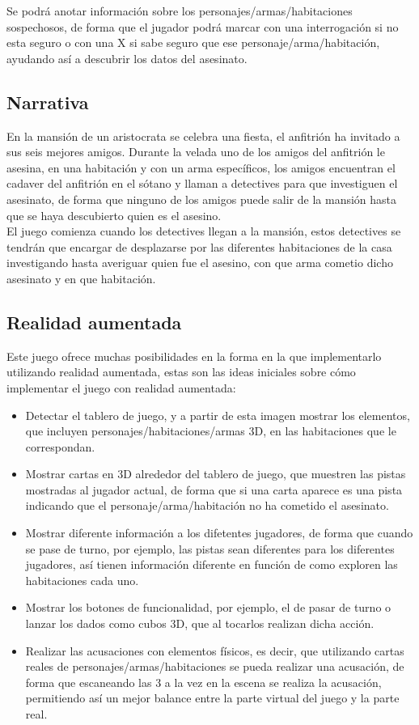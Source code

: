 Se podrá anotar información sobre los personajes/armas/habitaciones sospechosos, de forma que el jugador podrá marcar con una interrogación si no esta seguro o con una X si sabe seguro que ese personaje/arma/habitación, ayudando así a descubrir los datos del asesinato.

\subsection{Narrativa}
En la mansión de un aristocrata se celebra una fiesta, el anfitrión ha invitado a sus seis mejores amigos. Durante la velada uno de los amigos del anfitrión le asesina, en una habitación y con un arma específicos, los amigos encuentran el cadaver del anfitrión en el sótano y llaman a detectives para que investiguen el asesinato, de forma que ninguno de los amigos puede salir de la mansión hasta que se haya descubierto quien es el asesino.\\

El juego comienza cuando los detectives llegan a la mansión, estos detectives se tendrán que encargar de desplazarse por las diferentes habitaciones de la casa investigando hasta averiguar quien fue el asesino, con que arma cometio dicho asesinato y en que habitación.

\subsection{Realidad aumentada}
Este juego ofrece muchas posibilidades en la forma en la que implementarlo utilizando realidad aumentada, estas son las ideas iniciales sobre cómo implementar el juego con realidad aumentada:

\begin{itemize}
  \item Detectar el tablero de juego, y a partir de esta imagen mostrar los elementos, que incluyen personajes/habitaciones/armas 3D, en las habitaciones que le correspondan.
  \item Mostrar cartas en 3D alrededor del tablero de juego, que muestren las pistas mostradas al jugador actual, de forma que si una carta aparece es una pista indicando que el personaje/arma/habitación no ha cometido el asesinato.
  \item Mostrar diferente información a los difetentes jugadores, de forma que cuando se pase de turno, por ejemplo, las pistas sean diferentes para los diferentes jugadores, así tienen información diferente en función de como exploren las habitaciones cada uno.
  \item Mostrar los botones de funcionalidad, por ejemplo, el de pasar de turno o lanzar los dados como cubos 3D, que al tocarlos realizan dicha acción.
  \item Realizar las acusaciones con elementos físicos, es decir, que utilizando cartas reales de personajes/armas/habitaciones se pueda realizar una acusación, de forma que escaneando las 3 a la vez en la escena se realiza la acusación, permitiendo así un mejor balance entre la parte virtual del juego y la parte real.
\end{itemize}
